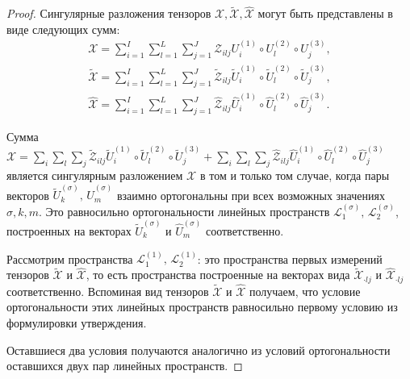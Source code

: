\documentclass[specialist,
    substylefile = spbu_report.rtx,
    subf,href,colorlinks=true, 12pt]{disser}
\theoremstyle{plain}
\theoremstyle{definition}
\theoremstyle{remark}
\begin{document}
    \begin{proof}
        Сингулярные разложения тензоров $\mathcal{X}, \widetilde{\mathcal{X}}, \widehat{\mathcal{X}}$ 
        могут быть представлены в виде
        следующих сумм:
        \[
            \begin{aligned}
                \mathcal{X}=\sum_{i=1}^{I} \sum_{l=1}^{L} \sum_{j=1}^{J} \mathcal{Z}_{ilj} U^{(1)}_{i}
                \circ U^{(2)}_{l} \circ U^{(3)}_{j},\\
                \widetilde{\mathcal{X}}=\sum_{i=1}^{I} \sum_{l=1}^{L} \sum_{j=1}^{J} \widetilde{\mathcal{Z}}_{ilj}
                \widetilde{U}^{(1)}_{i} \circ \widetilde{U}^{(2)}_{l} \circ \widetilde{U}^{(3)}_{j},\\
                \widehat{\mathcal{X}}=\sum_{i=1}^{I} \sum_{l=1}^{L} \sum_{j=1}^{J} \widehat{\mathcal{Z}}_{ilj}
                \widehat{U}^{(1)}_{i} \circ \widehat{U}^{(2)}_{l} \circ \widehat{U}^{(3)}_{j}.
            \end{aligned}
        \]

        Сумма $\mathcal{X} = \sum_{i} \sum_{l} \sum_{j} \tilde{\mathcal{Z}}_{ilj}
        \widetilde{U}^{(1)}_{i} \circ \widetilde{U}^{(2)}_{l} \circ \widetilde{U}^{(3)}_{j} +
        \sum_{i} \sum_{l} \sum_{j} \widehat{\mathcal{Z}}_{ilj} \widehat{U}^{(1)}_{i} \circ \widehat{U}^{(2)}_{l}
        \circ \widehat{U}^{(3)}_{j}$ является сингулярным разложением $\mathcal{X}$ в том и только том случае, когда
        пары векторов $\widetilde{U}^{(\sigma)}_{k},\, \widehat{U}^{(\sigma)}_{m}$ взаимно ортогональны
        при всех возможных значениях $\sigma, k, m$.
        Это равносильно ортогональности линейных пространств $\mathcal{L}^{(\sigma)}_{1},\, \mathcal{L}^{(\sigma)}_{2}$,
        построенных на векторах $\widetilde{U}^{(\sigma)}_{k}$ и $\widehat{U}^{(\sigma)}_{m}$ соответственно.

        Рассмотрим пространства $\mathcal{L}^{(1)}_{1},\, \mathcal{L}^{(1)}_{2}$: это пространства первых измерений
        тензоров $\widetilde{\mathcal{X}}$ и $\widehat{\mathcal{X}}$, то есть пространства построенные на векторах вида
        $\widetilde{\mathcal{X}}_{\cdot lj}$ и $\widehat{\mathcal{X}}_{\cdot lj}$ соответственно.
        Вспоминая вид тензоров $\widetilde{\mathcal{X}}$ и $\widehat{\mathcal{X}}$ получаем, 
        что условие ортогональности этих линейных пространств равносильно первому условию из формулировки утверждения.

        Оставшиеся два условия получаются аналогично из условий ортогональности оставшихся двух пар линейных пространств.
    \end{proof}
\end{document}
